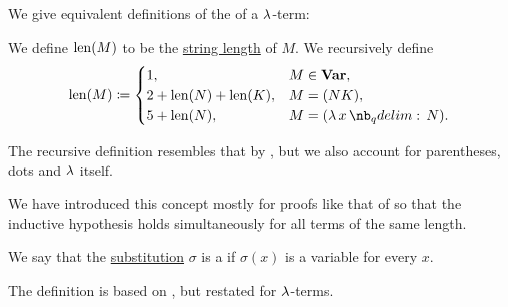 \begin{definition}\label{def:lambda_term_length}
  We give equivalent definitions of the  of a \( \mathrm{\lambda} \)-term:
  \begin{thmenum}
     We define \( \operatorname{len}(M) \) to be the \hyperref[def:formal_language/string_length]{string length} of \( M \).
     We recursively define
    \begin{equation*}
      \len(M) \coloneqq \begin{cases}
        1,                     &M \in \op*{Var}, \\
        2 + \len(N) + \len(K), &M = (NK), \\
        5 + \len(N),           &M = (\qabs x N). \\
      \end{cases}
    \end{equation*}
  \end{thmenum}
\end{definition}
\begin{comments}
  \item The recursive definition resembles that by , but we also account for parentheses, dots and \( \mathrm{\lambda} \) itself.
  \item We have introduced this concept mostly for proofs like that of  so that the inductive hypothesis holds simultaneously for all terms of the same length.
\end{comments}

\begin{definition}\label{def:lambda_renaming}
  We say that the \hyperref[def:lambda_substitution]{substitution} \( \sigma \) is a  if \( \sigma(x) \) is a variable for every \( x \).
\end{definition}
\begin{comments}
  \item The definition is based on \cite[252]{Mimram2020Types}, but restated for \( \mathrm{\lambda} \)-terms.
\end{comments}

